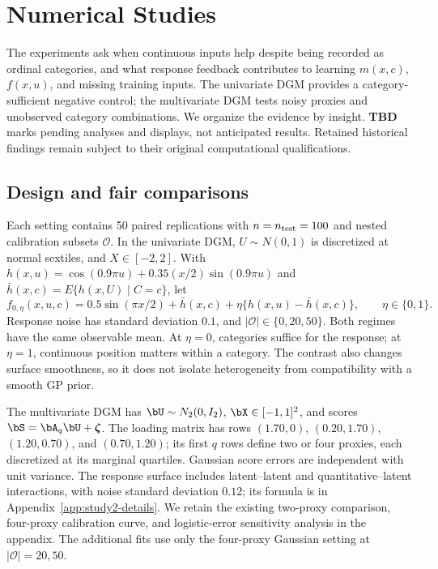 \section{Numerical Studies}
\label{sec:numerical-studies}

The experiments ask when continuous inputs help despite being recorded as ordinal categories, and what response feedback contributes to learning $m(x,c)$, $f(x,u)$, and missing training inputs. The univariate DGM provides a category-sufficient negative control; the multivariate DGM tests noisy proxies and unobserved category combinations. We organize the evidence by insight. \textbf{TBD} marks pending analyses and displays, not anticipated results. Retained historical findings remain subject to their original computational qualifications.

\subsection{Design and fair comparisons}
\label{sec:simulation-protocol}
\label{sec:sim-univariate-deterministic}
Each setting contains 50 paired replications with $n=n_{\rm test}=100$ and nested calibration subsets $\mathcal O$. In the univariate DGM, $U\sim N(0,1)$ is discretized at normal sextiles, and $X\in[-2,2]$. With $h(x,u)=\cos(0.9\pi u)+0.35(x/2)\sin(0.9\pi u)$ and $\bar h(x,c)=E\{h(x,U)\mid C=c\}$, let
\begin{equation}
\label{eq:study1-heterogeneity-dgm-main}
 f_{0,\eta}(x,u,c)=0.5\sin(\pi x/2)+\bar h(x,c)
                 +\eta\{h(x,u)-\bar h(x,c)\},\qquad \eta\in\{0,1\}.
\end{equation}
Response noise has standard deviation $0.1$, and $|\mathcal O|\in\{0,20,50\}$. Both regimes have the same observable mean. At $\eta=0$, categories suffice for the response; at $\eta=1$, continuous position matters within a category. The contrast also changes surface smoothness, so it does not isolate heterogeneity from compatibility with a smooth GP prior.

\label{sec:sim-multivariate-probit}
The multivariate DGM has $\bU\sim N_2(0,I_2)$, $\bX\in[-1,1]^2$, and scores $\bS=\bA_q\bU+\boldsymbol\zeta$. The loading matrix has rows $(1.70,0)$, $(0.20,1.70)$, $(1.20,0.70)$, and $(0.70,1.20)$; its first $q$ rows define two or four proxies, each discretized at its marginal quartiles. Gaussian score errors are independent with unit variance. The response surface includes latent--latent and quantitative--latent interactions, with noise standard deviation $0.12$; its formula is in Appendix~\ref{app:study2-details}. We retain the existing two-proxy comparison, four-proxy calibration curve, and logistic-error sensitivity analysis in the appendix. The additional fits use only the four-proxy Gaussian setting at $|\mathcal O|=20,50$.

